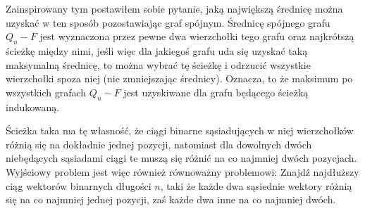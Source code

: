 \documentclass{pracamgr}
\begin{document}
   Zainspirowany tym postawiłem sobie pytanie, jaką największą średnicę można uzyskać w ten sposób pozostawiając graf spójnym.
   Średnicę spójnego grafu $Q_n-F$ jest wyznaczona przez pewne dwa wierzchołki tego grafu oraz najkrótszą ścieżkę między nimi,
   jeśli więc dla jakiegoś grafu uda się uzyskać
   taką maksymalną średnicę, to można wybrać tę ścieżkę i odrzucić wszystkie wierzchołki spoza niej (nie zmniejszając średnicy).
   Oznacza, to że maksimum po wszystkich grafach $Q_n-F$ jest uzyskiwane dla grafu będącego ścieżką indukowaną.
   
   Ścieżka taka ma tę własność, że ciągi binarne sąsiadujących w niej wierzchołków różnią się na dokładnie jednej pozycji,
   natomiast dla dowolnych dwóch niebędących sąsiadami ciągi te muszą się różnić na co najmniej dwóch pozycjach.
   Wyjściowy problem jest więc również równoważny problemowi:\newline
   Znajdź najdłuższy ciąg wektorów binarnych długości $n$, taki
   że każde dwa sąsiednie wektory różnią się na co najmniej jednej pozycji, zaś każde dwa inne na co najmniej dwóch.
\end{document}
